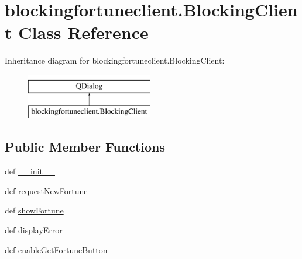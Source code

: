 \hypertarget{classblockingfortuneclient_1_1BlockingClient}{}\section{blockingfortuneclient.\+Blocking\+Client Class Reference}
\label{classblockingfortuneclient_1_1BlockingClient}
Inheritance diagram for blockingfortuneclient.\+Blocking\+Client\+:\begin{figure}[H]
\begin{center}
\leavevmode
\includegraphics[height=2.000000cm]{classblockingfortuneclient_1_1BlockingClient}
\end{center}
\end{figure}
\subsection*{Public Member Functions}
\begin{DoxyCompactItemize}
\item 
def \hyperlink{classblockingfortuneclient_1_1BlockingClient_afc07b5dbda37d136771b10b8fb4c30fd}{\+\_\+\+\_\+init\+\_\+\+\_\+}
\item 
def \hyperlink{classblockingfortuneclient_1_1BlockingClient_a6f73ad493cd9ef92aa8acd0788baa520}{request\+New\+Fortune}
\item 
def \hyperlink{classblockingfortuneclient_1_1BlockingClient_a674c4e36e1b394e4661c37056e2964e9}{show\+Fortune}
\item 
def \hyperlink{classblockingfortuneclient_1_1BlockingClient_a18939820b80373a35b6ce6fecaceca66}{display\+Error}
\item 
def \hyperlink{classblockingfortuneclient_1_1BlockingClient_a2b0422c5799390f8d7c1d9e9c4d092de}{enable\+Get\+Fortune\+Button}
\end{DoxyCompactItemize}
